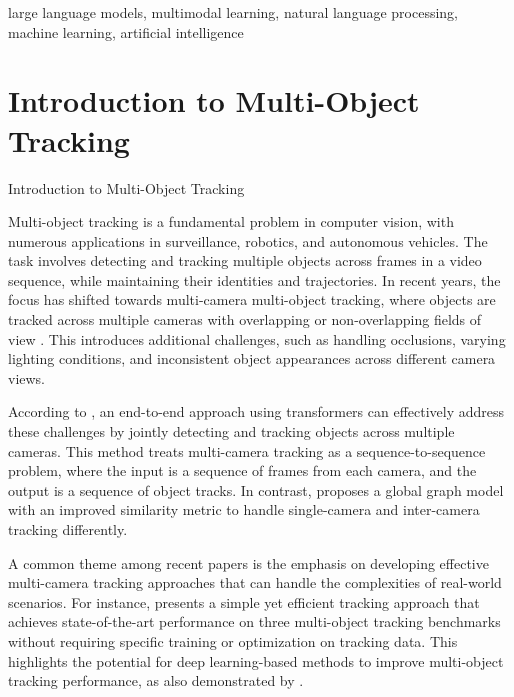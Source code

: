 \documentclass[conference]{IEEEtran}
\begin{document}
\begin{IEEEkeywords}
large language models, multimodal learning, natural language processing, machine learning, artificial intelligence
\end{IEEEkeywords}


\section{Introduction to Multi-Object Tracking}
Introduction to Multi-Object Tracking

Multi-object tracking is a fundamental problem in computer vision, with numerous applications in surveillance, robotics, and autonomous vehicles. The task involves detecting and tracking multiple objects across frames in a video sequence, while maintaining their identities and trajectories. In recent years, the focus has shifted towards multi-camera multi-object tracking, where objects are tracked across multiple cameras with overlapping or non-overlapping fields of view \cite{The Challenge of Multi-Camera Tracking}. This introduces additional challenges, such as handling occlusions, varying lighting conditions, and inconsistent object appearances across different camera views.

According to \cite{MCTR: Multi Camera Tracking Transformer}, an end-to-end approach using transformers can effectively address these challenges by jointly detecting and tracking objects across multiple cameras. This method treats multi-camera tracking as a sequence-to-sequence problem, where the input is a sequence of frames from each camera, and the output is a sequence of object tracks. In contrast, \cite{An equalised global graphical model-based approach for multi-camera object tracking} proposes a global graph model with an improved similarity metric to handle single-camera and inter-camera tracking differently.

A common theme among recent papers is the emphasis on developing effective multi-camera tracking approaches that can handle the complexities of real-world scenarios. For instance, \cite{Tracking without bells and whistles} presents a simple yet efficient tracking approach that achieves state-of-the-art performance on three multi-object tracking benchmarks without requiring specific training or optimization on tracking data. This highlights the potential for deep learning-based methods to improve multi-object tracking performance, as also demonstrated by \cite{Tracking the Trackers: An Analysis of the State of the Art in Multiple Object Tracking}.
\end{document}
